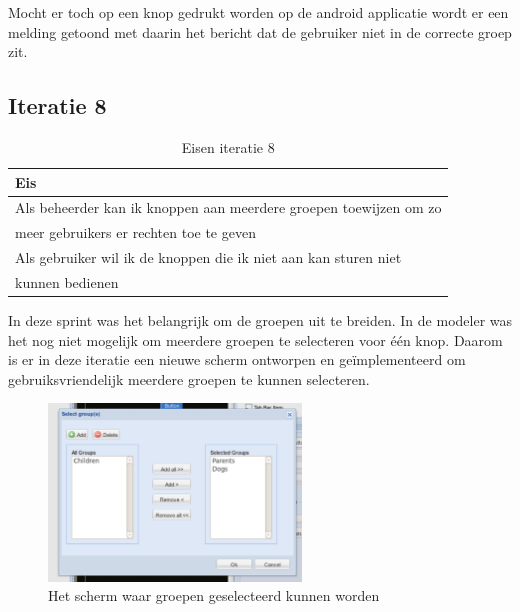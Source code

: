 \documentclass[]{article}
\begin{document}
Mocht er toch op een knop gedrukt worden op de android applicatie wordt er een
melding getoond met daarin het bericht dat de gebruiker niet in de correcte
groep zit. 

\subsection{Iteratie 8}

\begin{table}[htpb]
  \caption{Eisen iteratie 8}
  \begin{center}
    \begin{tabular}{|| l ||}\hline
        Eis                                                              \\\hline\hline
        Als beheerder kan ik knoppen aan meerdere groepen toewijzen om zo\\
        meer gebruikers er rechten toe te geven                          \\\hline
        Als gebruiker wil ik de knoppen die ik niet aan kan sturen niet  \\ 
        kunnen bedienen                                                  \\\hline
    \end{tabular}
  \end{center}
\end{table}

In deze sprint was het belangrijk om de groepen uit te breiden. In de modeler was
het nog niet mogelijk om meerdere groepen te selecteren voor \'e\'en knop.
Daarom is er in deze iteratie een nieuwe scherm ontworpen en ge\"implementeerd
om gebruiksvriendelijk meerdere groepen te kunnen selecteren.

\begin{figure}[h!]
  \centering
    \includegraphics[width=0.6\textwidth,keepaspectratio]{groupselect.pdf}
  \caption{Het scherm waar groepen geselecteerd kunnen worden}
  \label{groupselect}
\end{figure}
\end{document}
